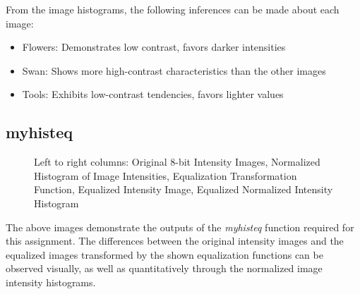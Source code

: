 \documentclass{article}[12 pt]
\begin{document}
From the image histograms, the following inferences can be made about each image: 
\begin{itemize}
\item Flowers: Demonstrates low contrast, favors darker intensities
\item Swan: Shows more high-contrast characteristics than the other images
\item Tools: Exhibits low-contrast tendencies, favors lighter values
\end{itemize}

\newpage
\subsection*{myhisteq}

\begin{figure}[h!]
\captionsetup[subfloat]{labelformat=empty}
\centering
{}
\hspace{0mm}
\hspace{0mm}
\caption{Left to right columns: Original 8-bit Intensity Images,  Normalized Histogram of Image Intensities, Equalization Transformation Function, Equalized Intensity Image, Equalized Normalized Intensity Histogram}
\end{figure}

\noindent
The above images demonstrate the outputs of the \emph{myhisteq} function required for this assignment.  The differences between the original intensity images and the equalized images transformed by the shown equalization functions can be observed visually, as well as quantitatively through the normalized image intensity histograms.
\end{document}
